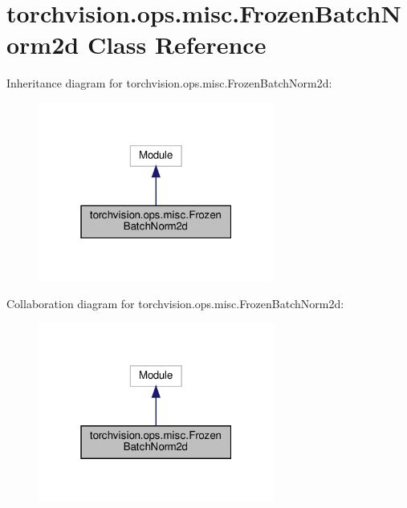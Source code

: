 \hypertarget{classtorchvision_1_1ops_1_1misc_1_1FrozenBatchNorm2d}{}\section{torchvision.\+ops.\+misc.\+Frozen\+Batch\+Norm2d Class Reference}
\label{classtorchvision_1_1ops_1_1misc_1_1FrozenBatchNorm2d}


Inheritance diagram for torchvision.\+ops.\+misc.\+Frozen\+Batch\+Norm2d\+:
\nopagebreak
\begin{figure}[H]
\begin{center}
\leavevmode
\includegraphics[width=220pt]{classtorchvision_1_1ops_1_1misc_1_1FrozenBatchNorm2d__inherit__graph}
\end{center}
\end{figure}


Collaboration diagram for torchvision.\+ops.\+misc.\+Frozen\+Batch\+Norm2d\+:
\nopagebreak
\begin{figure}[H]
\begin{center}
\leavevmode
\includegraphics[width=220pt]{classtorchvision_1_1ops_1_1misc_1_1FrozenBatchNorm2d__coll__graph}
\end{center}
\end{figure}
